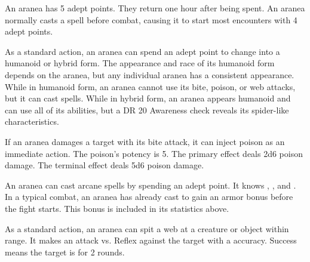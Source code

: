      An aranea has 5 adept points.
    They return one hour after being spent.
    An aranea normally casts a spell before combat, causing it to start most encounters with 4 adept points.

     As a standard action, an aranea can spend an adept point to change into a humanoid or hybrid form.
    The appearance and race of its humanoid form depends on the aranea, but any individual aranea has a consistent appearance.
    While in humanoid form, an aranea cannot use its bite, poison, or web attacks, but it can cast spells.
    While in hybrid form, an aranea appears humanoid and can use all of its abilities, but a DR 20 Awareness check reveals its spider-like characteristics.

     If an aranea damages a target with its bite attack, it can inject poison as an immediate action.
    The poison's potency is 5.
    The primary effect deals 2d6 poison damage.
    The terminal effect deals 5d6 poison damage.

     An aranea can cast arcane spells by spending an adept point.
    It knows , , and .
    In a typical combat, an aranea has already cast  to gain an armor bonus before the fight starts.
    This bonus is included in its statistics above.

     As a standard action, an aranea can spit a web at a creature or object within \rngmed range.
    It makes an attack vs. Reflex against the target with a  accuracy.
    Success means the target is \immobilized for 2 rounds.
